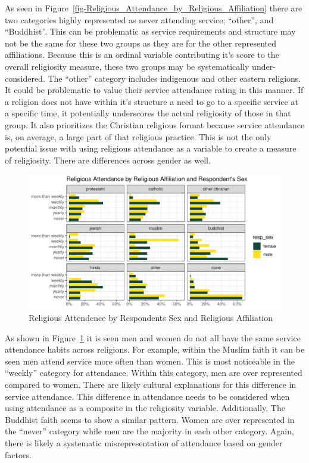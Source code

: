 \documentclass[
  12pt,
  letterpaper,
]{article}
\begin{document}
As seen in
Figure~\ref{fig-Religious_Attendance_by_Religious_Affiliation} there are
two categories highly represented as never attending service; ``other'',
and ``Buddhist''. This can be problematic as service requirements and
structure may not be the same for these two groups as they are for the
other represented affiliations. Because this is an ordinal variable
contributing it's score to the overall religiosity measure, these two
groups may be systematically under-considered. The ``other'' category
includes indigenous and other eastern religions. It could be problematic
to value their service attendance rating in this manner. If a religion
does not have within it's structure a need to go to a specific service
at a specific time, it potentially underscores the actual religiosity of
those in that group. It also prioritizes the Christian religious format
because service attendance is, on average, a large part of that
religious practice. This is not the only potential issue with using
religious attendance as a variable to create a measure of religiosity.
There are differences across gender as well.

\begin{figure}[!t]

{\centering \includegraphics{main_manuscript_files/figure-pdf/fig-Religious_Attendance_by_Respondents_Sex_and_Religious_Affilation-1.pdf}

}

\caption{\label{fig-Religious_Attendance_by_Respondents_Sex_and_Religious_Affilation}Religious
Attendence by Respondents Sex and Religious Affiliation}

\end{figure}

As shown in
Figure~\ref{fig-Religious_Attendance_by_Respondents_Sex_and_Religious_Affilation}
it is seen men and women do not all have the same service attendance
habits across religions. For example, within the Muslim faith it can be
seen men attend service more often than women. This is most noticeable
in the ``weekly'' category for attendance. Within this category, men are
over represented compared to women. There are likely cultural
explanations for this difference in service attendance. This difference
in attendance needs to be considered when using attendance as a
composite in the religiosity variable. Additionally, The Buddhist faith
seems to show a similar pattern. Women are over represented in the
``never'' category while men are the majority in each other category.
Again, there is likely a systematic misrepresentation of attendance
based on gender factors.
\end{document}
